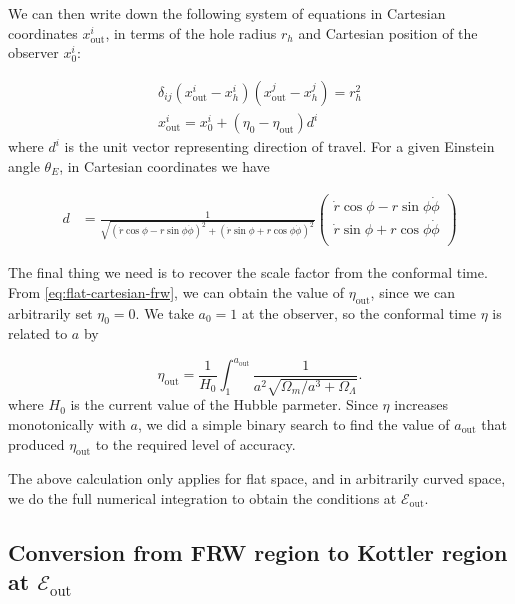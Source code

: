 We can then write down the following system of equations in Cartesian coordinates $x^i_{\text{out}}$, in terms of the hole radius $r_h$ and Cartesian position of the observer $x^i_0$:

\begin{subequations}
  \begin{align}
  \delta_{ij} (x^i_{\text{out}} - x^i_h)(x^j_{\text{out}} - x^j_h) = r_h^2\\
  x^i_{\text{out}} = x^i_0 + (\eta_0 - \eta_{\text{out}})d^i    
  \end{align}
  \label{eq:flat-cartesian-frw}%
\end{subequations}
where $d^i$ is the unit vector representing direction of travel. For a given Einstein angle $\theta_E$, in Cartesian coordinates we have 

\begin{align}
    d &= \frac{1}{\sqrt{(\dot{r}\cos\phi - r\sin\phi\dot{\phi})^2 + (\dot{r}\sin\phi + r\cos\phi\dot{\phi})^2}}
          \begin{pmatrix}
           \dot{r}\cos\phi - r\sin\phi\dot{\phi} \\
           \dot{r}\sin\phi + r\cos\phi\dot{\phi} \\
         \end{pmatrix}
\end{align}

The final thing we need is to recover the scale factor from the conformal time. From \autoref{eq:flat-cartesian-frw}, we can obtain the value of $\eta_{\text{out}}$, since we can arbitrarily set $\eta_0 = 0$. We take $a_0 = 1$ at the observer, so the conformal time $\eta$ is related to $a$ by

\begin{equation}
  \eta_{\text{out}} = \frac{1}{H_0} \int_1^{a_{\text{out}}} \frac{1}{a^2 \sqrt{\Omega_m/a^3 + \Omega_{\Lambda}}}.
  \label{eq:conformal-time-eta-to-a-integral}
\end{equation}
where $H_0$ is the current value of the Hubble parmeter. Since $\eta$ increases monotonically with $a$, we did a simple binary search to find the value of $a_{\text{out}}$ that produced $\eta_{\text{out}}$ to the required level of accuracy. 

The above calculation only applies for flat space, and in arbitrarily curved space, we do the full numerical integration to obtain the conditions at $\mathcal{E}_{\text{out}}$.

\subsection{Conversion from FRW region to Kottler region at $\mathcal{E}_{\text{out}}$}
\label{subsec:frw-to-kottler}

